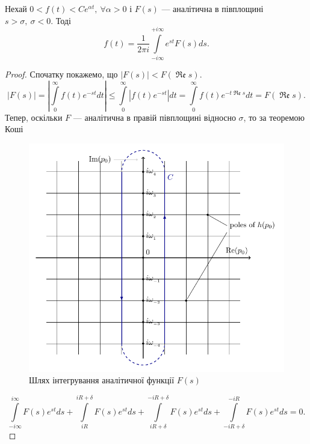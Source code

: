 \begin{corollary}
\label{eq:mellin_analytic}
Нехай $0 < f(t) < Ce^{\alpha t}, ~ \forall \alpha > 0$ і $F(s)$ --- аналітична в півплощині $s > \sigma, ~\sigma < 0$. Тоді
\begin{equation}
f(t) = \frac{1}{2\pi i}\int\limits_{- i\infty}^{+ i\infty} e^{st} F(s) ds.
\end{equation}
\begin{proof}
Спочатку покажемо, що $|F(s)| < F(\operatorname{\mathfrak{Re}} s)$.
\begin{equation*}
|F(s)| = \left| \int\limits_{0}^{\infty}  f(t) e^{-st} dt \right| \leq \int\limits_{0}^{\infty} \left|f(t) e^{-st} \right| dt = \int\limits_{0}^{\infty} f(t)  e^{-t\operatorname{\mathfrak{Re}} s}  dt = F(\operatorname{\mathfrak{Re}} s).
\end{equation*}
Тепер, оскільки $F$ --- аналітична в правій півплощині відносно $\sigma$, то за теоремою Коші \cite{lavrentiev1965}
\begin{figure}[h]
	\centering
	\includegraphics{chapter_Asymptotics/img/contour_bar}
	\caption{Шлях інтегрування аналітичної функції $F(s)$}
\end{figure}
\begin{equation*}
\int\limits_{-i\infty}^{i\infty} F(s) e^{st} ds + \int\limits_{iR}^{iR + \delta} F(s) e^{st} ds + \int\limits_{iR + \delta}^{-iR + \delta} F(s) e^{st} ds + \int\limits_{-iR + \delta}^{-iR} F(s) e^{st} ds = 0.
\end{equation*}

\end{proof}
\end{corollary}
